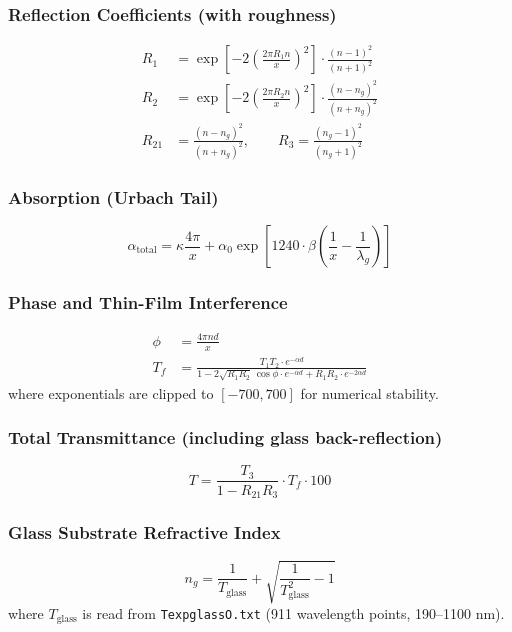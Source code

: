 \documentclass[11pt,a4paper]{article}
\begin{document}
\subsubsection*{Reflection Coefficients (with roughness)}
\begin{align*}
    R_1 &= \exp\!\left[-2\left(\frac{2\pi R_1 n}{x}\right)^2\right] \cdot \frac{(n-1)^2}{(n+1)^2} \\[4pt]
    R_2 &= \exp\!\left[-2\left(\frac{2\pi R_2 n}{x}\right)^2\right] \cdot \frac{(n-n_g)^2}{(n+n_g)^2} \\[4pt]
    R_{21} &= \frac{(n-n_g)^2}{(n+n_g)^2}, \qquad
    R_3 = \frac{(n_g-1)^2}{(n_g+1)^2}
\end{align*}

\subsubsection*{Absorption (Urbach Tail)}
\begin{equation*}
    \alpha_{\text{total}} = \kappa \frac{4\pi}{x} + \alpha_0 \exp\!\left[1240 \cdot \beta \left(\frac{1}{x} - \frac{1}{\lambda_g}\right)\right]
\end{equation*}

\subsubsection*{Phase and Thin-Film Interference}
\begin{align*}
    \phi &= \frac{4\pi n d}{x} \\[4pt]
    T_f &= \frac{T_1 T_2 \cdot e^{-\alpha d}}{1 - 2\sqrt{R_1 R_2}\,\cos\phi \cdot e^{-\alpha d} + R_1 R_2 \cdot e^{-2\alpha d}}
\end{align*}
where exponentials are clipped to $[-700, 700]$ for numerical stability.

\subsubsection*{Total Transmittance (including glass back-reflection)}
\begin{equation*}
    T = \frac{T_3}{1 - R_{21}R_3} \cdot T_f \cdot 100
\end{equation*}

\subsubsection*{Glass Substrate Refractive Index}
\begin{equation*}
    n_g = \frac{1}{T_{\text{glass}}} + \sqrt{\frac{1}{T_{\text{glass}}^2} - 1}
\end{equation*}
where $T_{\text{glass}}$ is read from {\tt TexpglassO.txt} (911 wavelength points, 190--1100 nm).
\end{document}
